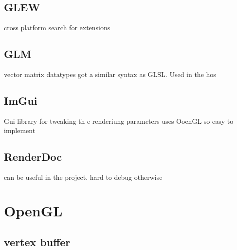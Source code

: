 \subsection*{GLEW}
cross platform search for extensions

\subsection*{GLM}
vector matrix datatypes  got a similar syntax as GLSL. Used in the hos 

\subsection*{ImGui}
Gui library for tweaking th e renderiung parameters
uses OoenGL so easy to implement 

\subsection*{RenderDoc}
can be useful in the project. hard to debug otherwise


\section{OpenGL}
\subsection*{vertex buffer}







